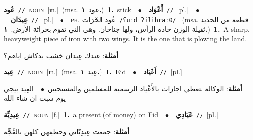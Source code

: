 \documentclass[10pt,a4paper,twoside]{article} %
\begin{document}
\begin{multicols}{2}
{\setlength\topsep{0pt}\textbf{\foreignlanguage{arabic}{عُود}}\ {\color{gray}\texttt{//}\color{black}}\ \textsc{noun}\ [m.]\ \color{gray}(msa. \foreignlanguage{arabic}{عود}~\foreignlanguage{arabic}{\textbf{١.}})\color{black}\ \textbf{1.}~stick\ \ $\bullet$\ \ \setlength\topsep{0pt}\textbf{\foreignlanguage{arabic}{أَعْوَاد}}\ {\color{gray}\texttt{//}\color{black}}\ [pl.]\ \ $\bullet$\ \ \setlength\topsep{0pt}\textbf{\foreignlanguage{arabic}{عِيدَان}}\ {\color{gray}\texttt{//}\color{black}}\ [pl.]\ \ $\bullet$\ \ \textsc{ph.} \color{gray} \foreignlanguage{arabic}{عُود الحْرَاث}\color{black}\ {\color{gray}\texttt{/{\sffamily ʕuːd ʔiliħraːθ}/}\color{black}}\ \color{gray} (msa. \foreignlanguage{arabic}{قطعة من الحديد ثقيلة الوزن حادة الرأس، ولها جناحان. وهي التي تقوم بحراثة الأرض.}~\foreignlanguage{arabic}{\textbf{١.}})\color{black}\ \textbf{1.}~A sharp, heavyweight piece of iron with two wings. It is the one that is plowing the land.\  \begin{flushright}\color{gray}\foreignlanguage{arabic}{\textbf{\underline{\foreignlanguage{arabic}{أمثلة}}}: عندك عِيدان خشب بدكاش اياهم؟}\end{flushright}\color{black}} \vspace{2mm}

{\setlength\topsep{0pt}\textbf{\foreignlanguage{arabic}{عِيد}}\ {\color{gray}\texttt{//}\color{black}}\ \textsc{noun}\ [m.]\ \color{gray}(msa. \foreignlanguage{arabic}{عِيد}~\foreignlanguage{arabic}{\textbf{١.}})\color{black}\ \textbf{1.}~Eid\ \ $\bullet$\ \ \setlength\topsep{0pt}\textbf{\foreignlanguage{arabic}{أَعْيَاد}}\ {\color{gray}\texttt{//}\color{black}}\ [pl.]\  \begin{flushright}\color{gray}\foreignlanguage{arabic}{\textbf{\underline{\foreignlanguage{arabic}{أمثلة}}}: الوكالة بتعطي اجازات بالأَعْياد الرسمية للمسلمين والمسيحيين\ $\bullet$\ \  العِيد بيجي يوم سبت ان شاء الله}\end{flushright}\color{black}} \vspace{2mm}

{\setlength\topsep{0pt}\textbf{\foreignlanguage{arabic}{عِيدِيِّة}}\ {\color{gray}\texttt{//}\color{black}}\ \textsc{noun}\ [f.]\ \textbf{1.}~a present (of money) on Eid\ \ $\bullet$\ \ \setlength\topsep{0pt}\textbf{\foreignlanguage{arabic}{عَيَادِي}}\ {\color{gray}\texttt{//}\color{black}}\ [pl.]\  \begin{flushright}\color{gray}\foreignlanguage{arabic}{\textbf{\underline{\foreignlanguage{arabic}{أمثلة}}}: جمعت عِيدِيّاتي وحطيتهن كلهن بالقُجِّة}\end{flushright}\color{black}} \vspace{2mm}


\end{multicols}
\end{document}

